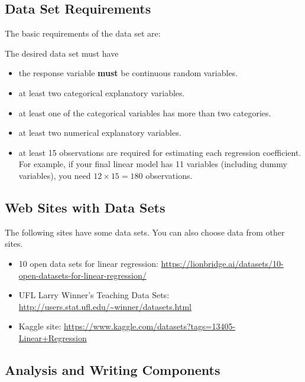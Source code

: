 \documentclass[
]{book}
\begin{document}
\hypertarget{data-set-requirements}{%
\subsection{Data Set Requirements}\label{data-set-requirements}}

The basic requirements of the data set are:

The desired data set must have

\begin{itemize}
\item
  the response variable \textbf{must} be continuous random variables.
\item
  at least two categorical explanatory variables.
\item
  at least one of the categorical variables has more than two categories.
\item
  at least two numerical explanatory variables.
\item
  at least 15 observations are required for estimating each regression coefficient. For example, if your final linear model has 11 variables (including dummy variables), you need \(12 \times 15 = 180\) observations.
\end{itemize}

\hypertarget{web-sites-with-data-sets}{%
\subsection{Web Sites with Data Sets}\label{web-sites-with-data-sets}}

The following sites have some data sets. You can also choose data from other sites.

\begin{itemize}
\item
  10 open data sets for linear regression: \url{https://lionbridge.ai/datasets/10-open-datasets-for-linear-regression/}
\item
  UFL Larry Winner's Teaching Data Sets: \url{http://users.stat.ufl.edu/~winner/datasets.html}
\item
  Kaggle site: \url{https://www.kaggle.com/datasets?tags=13405-Linear+Regression}
\end{itemize}

\hypertarget{analysis-and-writing-components}{%
\subsection{Analysis and Writing Components}\label{analysis-and-writing-components}}
\end{document}
